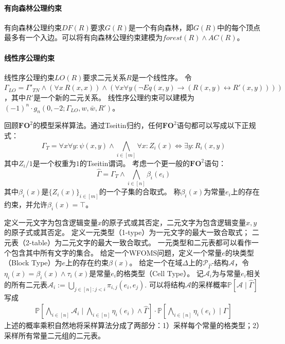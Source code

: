 \documentclass[12pt,UTF8,AutoFakeBold=3,a4paper]{ctexart} %
\newcommand{\sentence}{\Gamma}
\newcommand{\generalsentence}{{\widehat{\sentence}}}
\newcommand{\fotwoformula}{\psi}
\newcommand{\weight}{w}
\newcommand{\negweight}{\bar{w}}
\newcommand{\fotwo}{\ensuremath{\mathbf{FO}^2}}
\newcommand{\domain}{\Delta}
\newcommand{\pro}{\mathbb{P}}
\newcommand{\structure}{\mathcal{A}}
\begin{document}
\paragraph{有向森林公理约束} 有向森林公理约束$DF(R)$要求$G(R)$是一个有向森林，即$G(R)$中的每个顶点最多有一个入边。可以将有向森林公理约束建模为$forest(R)\land AC(R)$。

\paragraph{线性序公理约束} 线性序公理约束$LO(R)$要求二元关系$R$是一个线性序。
令$\sentence_{LO} = \sentence'_{TN} \land (\forall x \ R(x,x)) \land (\forall x \forall y (\lnot Eq(x,y) \to (R(x,y) \leftrightarrow R'(x,y))))$，其中$R'$是一个新的二元关系。
线性序公理约束可以建模为$(-1)^n \cdot g_{n}(0, -2; \sentence_{LO}, \weight, \negweight, R')$。


回顾\fotwo{}的模型采样算法。通过Tseitin归约，任何$\mathbf{FO}^2$语句都可以写成以下正规式：
\begin{equation}
  \sentence_T = \forall x\forall y: \fotwoformula(x,y) \land \bigwedge_{i\in [m]} \forall x: Z_i(x) \Leftrightarrow \exists y: R_i(x,y)
  \label{eq:tseitin_reduction}
\end{equation}
其中$Z_i/1$是一个权重为$1$的Tseitin谓词。
考虑一个更一般的\fotwo{}语句：
\begin{equation}
  \generalsentence = \sentence_T \land \bigwedge_{i\in [n]} \beta_i(e_i)
  \label{eq:general_sentence}
\end{equation}
其中$\beta_i(x)$是$\{Z_i(x)\}_{i\in[m]}$的一个子集的合取式。
称$\beta_i(x)$为常量$e_i$上的存在约束，并允许$\beta_i(x)=\top$。

定义一元文字为包含逻辑变量$x$的原子式或其否定，二元文字为包含逻辑变量$x,y$的原子式或其否定。
定义一元类型（1-type）为一元文字的最大一致合取式；
二元表（2-table）为二元文字的最大一致合取式。
一元类型和二元表都可以看作一个包含其中所有文字的集合。
给定一个WFOMS问题，定义一个常量$e$的块类型（Block Type）为$e$上的存在约束$\beta(x)$。
给定一个在域$\domain$上的$\mathcal{P}_\generalsentence$-结构$\structure$，令$\eta_i(x) = \beta_i(x)\land \tau_i(x)$是常量$e_i$的格类型（Cell Type）。
记$\structure_i$为与常量$e_i$相关的所有二元表$\structure_i := \bigcup_{j\in[n]: j<i} \pi_{i,j}(e_i, e_j)$.
可以将结构$\structure$的采样概率$\pro[\structure\mid \generalsentence]$写成
\begin{equation}
  \begin{aligned}
     \pro\left[\bigwedge_{i\in[n]} \structure_i\mid \bigwedge_{i\in[n]}\eta_i(e_i)\land \generalsentence\right]\cdot \pro\left[\bigwedge_{i\in[n]}\eta_i(e_i)\mid \generalsentence\right]
  \end{aligned}
  \label{eq:sampling_cell_type}
\end{equation}
上述的概率乘积自然地将采样算法分成了两部分：1）采样每个常量的格类型；2）采样所有常量二元组的二元表。
\end{document}
